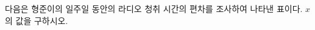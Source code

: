 다음은 형준이의 일주일 동안의 라디오 청취 시간의 편차를 조사하여 나타낸 표이다. $x$의 값을 구하시오.
\par\smallskip\begin{center}\resizebox{\ifdim\width>\linewidth\linewidth\else\width\fi}{!}{}\end{center}
